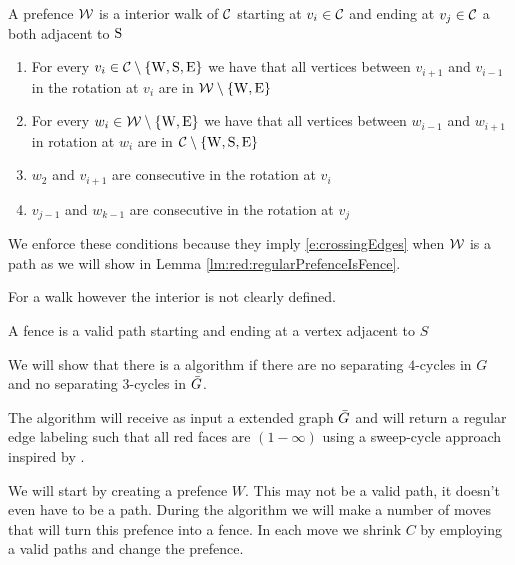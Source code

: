\begin{defi}[Prefence]
A prefence $\mathcal{W}$ is a interior walk of $\mathcal{C}$ starting at $v_i \in \mathcal{C}$ and ending at $v_j \in \mathcal{C}$ a both adjacent to $\mathrm{S}$
\begin{enumerate}
 \renewcommand*{\labelenumi}{(P\arabic{enumi})}%
 \renewcommand*{\theenumi}{(P\arabic{enumi})}%
  \item  For every $v_i \in \mathcal{C} \setminus \left\lbrace {\mathrm{W}, \mathrm{S}, \mathrm{E}} \right\rbrace$ we have that all vertices between $v_{i+1}$ and $v_{i-1}$ in the rotation at $v_i$ are in $\mathcal{W} \setminus \left\lbrace {\mathrm{W}, \mathrm{E}} \right\rbrace$
  \label{p:C}
  \item For every $w_i \in \mathcal{W} \setminus \left\lbrace {\mathrm{W}, \mathrm{E}} \right\rbrace$ we have that all vertices between $w_{i-1}$ and $w_{i+1}$ in rotation at $w_i$ are in $\mathcal{C} \setminus \left\lbrace {\mathrm{W}, \mathrm{S}, \mathrm{E}} \right\rbrace$
  \label{p:W}
  \item $w_2$ and $v_{i+1}$ are consecutive in the rotation at $v_i$
  \label{p:pW}
  \item $v_{j-1}$ and $w_{k-1}$ are consecutive in the rotation at $v_j$
  \label{p:pE}
\end{enumerate}
\end{defi}


We enforce these conditions because they imply \ref{e:crossingEdges} when $\mathcal{W}$ is a path as we will show in Lemma \ref{lm:red:regularPrefenceIsFence}.

For a walk however the interior is not clearly defined.

\begin{defi}[Fence]
A fence is a valid path starting and ending at a vertex adjacent to $S$
\end{defi}



We will show that there is a algorithm if there are no separating $4$-cycles in $G$ and no separating $3$-cycles in $\bar{G}$.


The algorithm will receive as input a extended graph $\bar{G}$ and will return a regular edge labeling such that all red faces are $(1-\infty)$ using a sweep-cycle approach inspired by \Fusy \cite{Fusy2006}.

We will start by creating a prefence $W$. This may not be a valid path, it doesn't even have to be a path. During the algorithm we will make a number of moves that will turn this prefence into a fence. In each move we shrink $C$ by employing a valid paths and change the prefence.

